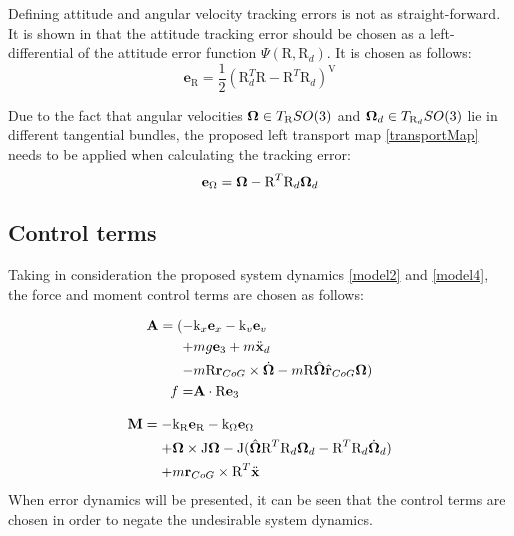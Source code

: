 \noindent Defining attitude and angular velocity tracking errors is not as straight-forward. It is shown in \cite{bulloBook} that the attitude tracking error should be chosen as a left-differential of the attitude error function $\Psi(\text{R}, \text{R}_d)$. It is chosen as follows:
\begin{equation}
	\textbf{e}_\text{R} = \frac{1}{2}(\text{R}_d^T\text{R} - \text{R}^T\text{R}_d)^\text{V}
\end{equation}

\noindent Due to the fact that angular velocities $\boldsymbol{\Omega} \in T_\text{R}SO(3)$ and $\boldsymbol{\Omega}_d \in T_{\text{R}_d}SO(3)$ lie in different tangential bundles, the proposed left transport map \ref{transportMap} needs to be applied when calculating the tracking error:
\begin{equation}
	\textbf{e}_\Omega = \boldsymbol{\Omega} - \text{R}^T\text{R}_d\boldsymbol{\Omega}_d \label{angular_error}
\end{equation}

\subsection{Control terms}

Taking in consideration the proposed system dynamics \ref{model2} and \ref{model4}, the force and moment control terms are chosen as follows:

\begin{align}
	\begin{split}
		\textbf{A} = (-& \text{k}_x \textbf{e}_x - \text{k}_v \textbf{e}_v \\
		+& mg\textbf{e}_3 + m\ddot{\textbf{x}}_d \\
		-& m\text{R}\textbf{r}_{CoG}  \times \dot{\boldsymbol{\Omega}} - m\text{R}\hat{\boldsymbol{\Omega}}\hat{\textbf{r}}_{CoG}\boldsymbol{\Omega} ) \\
		f =& \textbf{A} \cdot \text{R}\textbf{e}_3 \label{force_control}
	\end{split}
\end{align}

\begin{align}
	\begin{split}
		\textbf{M} = -& \text{k}_\text{R} \textbf{e}_\text{R} - \text{k}_\Omega \textbf{e}_\Omega \\
			+& \boldsymbol{\Omega} \times \text{J}\boldsymbol{\Omega} - \text{J}(\hat{\boldsymbol{\Omega}}\text{R}^T\text{R}_d\boldsymbol{\Omega}_d - \text{R}^T\text{R}_d\dot{\boldsymbol{\Omega}}_d) \\
			+& m\textbf{r}_{CoG} \times \text{R}^T \ddot{\textbf{x}}  \label{moment_control}
	\end{split}
\end{align}
\noindent When error dynamics will be presented, it can be seen that the control terms are chosen in order to negate the undesirable system dynamics.

